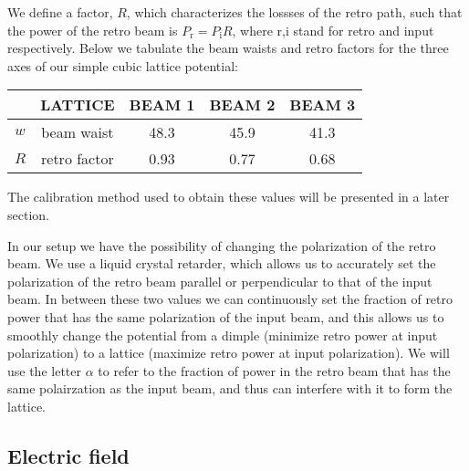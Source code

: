 We define a factor, $R$,  which characterizes the lossses of the retro path,
such that the power of the retro beam is $P_{\text{r}} = P_{\text{i}} R$, where
r,i stand for retro and input respectively.    Below we tabulate the beam
waists and retro factors for the three axes of our simple cubic lattice
potential: 
\begin{center}
\begin{tabular}{c|c|c|c|c}
      & LATTICE& BEAM 1 & BEAM 2 & BEAM 3   \\ \hline \hline 
  $w  $ &  beam waist  & 48.3 & 45.9 & 41.3 \\
  $R $ &  retro factor & 0.93 & 0.77 & 0.68\\
\end{tabular}
\end{center}
The calibration method used to obtain these values will be presented in a later
section. 

In our setup we have the possibility of changing the polarization
of the retro beam.   We use a liquid crystal retarder, which allows us to
accurately set the polarization of the retro beam parallel or perpendicular to
that of the input beam.   In between these two values we can continuously set
the fraction of retro power that has the same polarization of the input beam,
and this allows us to smoothly change the potential from a dimple (minimize
retro power at input polarization) to a lattice (maximize retro power at input
polarization).    We will use the letter $\alpha$ to refer to the fraction of
power in the retro beam that has the same polairzation as the input beam, and
thus can interfere with it to form the lattice. 

\subsection{Electric field}

